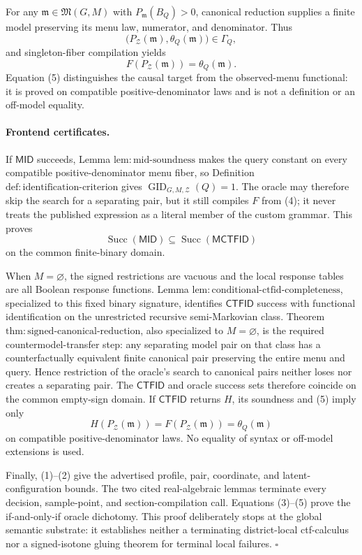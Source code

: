 For any \(\mathfrak m\in\mathfrak M(G,M)\) with \(P_{\mathfrak m}(B_Q)>0\), canonical reduction supplies a finite model preserving its menu law, numerator, and denominator.  Thus
\[
 \bigl(P_{\mathcal Z}(\mathfrak m),\theta_Q(\mathfrak m)\bigr)\in\Gamma_Q,
\]
and singleton-fiber compilation yields
\[
 F(P_{\mathcal Z}(\mathfrak m))=\theta_Q(\mathfrak m).
\tag{5}
\]
Equation (5) distinguishes the causal target from the observed-menu functional: it is proved on compatible positive-denominator laws and is not a definition or an off-model equality.

\paragraph{Frontend certificates.}
If \(\mathsf{MID}\) succeeds, Lemma \(\mathrm{lem:mid\text{-}soundness}\) makes the query constant on every compatible positive-denominator menu fiber, so Definition \(\mathrm{def:identification\text{-}criterion}\) gives \(\operatorname{GID}_{G,M,\mathcal Z}(Q)=1\).  The oracle may therefore skip the search for a separating pair, but it still compiles \(F\) from (4); it never treats the published expression as a literal member of the custom grammar.  This proves
\[
 \operatorname{Succ}(\mathsf{MID})
 \subseteq\operatorname{Succ}(\mathsf{MCTFID})
\tag{6}
\]
on the common finite-binary domain.

When \(M=\varnothing\), the signed restrictions are vacuous and the local response tables are all Boolean response functions.  Lemma \(\mathrm{lem:conditional\text{-}ctfid\text{-}completeness}\), specialized to this fixed binary signature, identifies \(\mathsf{CTFID}\) success with functional identification on the unrestricted recursive semi-Markovian class.  Theorem \(\mathrm{thm:signed\text{-}canonical\text{-}reduction}\), also specialized to \(M=\varnothing\), is the required countermodel-transfer step: any separating model pair on that class has a counterfactually equivalent finite canonical pair preserving the entire menu and query.  Hence restriction of the oracle's search to canonical pairs neither loses nor creates a separating pair.  The \(\mathsf{CTFID}\) and oracle success sets therefore coincide on the common empty-sign domain.  If \(\mathsf{CTFID}\) returns \(H\), its soundness and (5) imply only
\[
 H(P_{\mathcal Z}(\mathfrak m))
 =F(P_{\mathcal Z}(\mathfrak m))
 =\theta_Q(\mathfrak m)
\]
on compatible positive-denominator laws.  No equality of syntax or off-model extensions is used.

Finally, (1)--(2) give the advertised profile, pair, coordinate, and latent-configuration bounds.  The two cited real-algebraic lemmas terminate every decision, sample-point, and section-compilation call.  Equations (3)--(5) prove the if-and-only-if oracle dichotomy.  This proof deliberately stops at the global semantic substrate: it establishes neither a terminating district-local ctf-calculus nor a signed-isotone gluing theorem for terminal local failures. \(\square\)